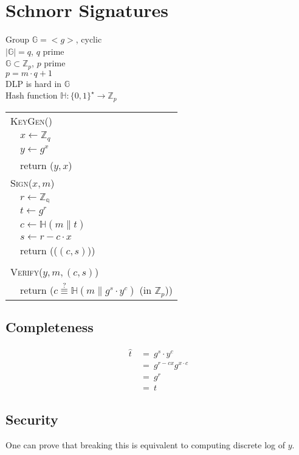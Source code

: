 \documentclass{report}
\begin{document}
\section{Schnorr Signatures}
\begin{adjustwidth}{2em}{2em}
	Group $\mathbb{G} = <g>$, cyclic \\
	$\mid \mathbb{G} \mid = q$, $q$ prime \\
	$\mathbb{G} \subset \mathbb{Z}_p$, $p$ prime \\
	$p = m \cdot q + 1$ \\
	DLP is hard in $\mathbb{G}$ \\
	Hash function $\mathbb{H}: \{ 0,1 \} ^{\star} \rightarrow \mathbb{Z}_p$ \\
	\begin{tabular}{ll}
		\multicolumn{2}{l}{\textsc{KeyGen}()} \\
		& $x \leftarrow \mathbb{Z}_q$ \\
		& $y \leftarrow g^x$ \\
		& return ($y, x$) \\
		\multicolumn{2}{l}{\textsc{Sign}($x, m$)} \\
		& $r \leftarrow \mathbb{Z_q}$ \\
		& $t \leftarrow g^r$ \\
		& $c \leftarrow \mathbb{H}(m \| t)$ \\
		& $s \leftarrow r - c \cdot x$ \\
		& return (($(c, s)$)) \\
		\\
		\multicolumn{2}{l}{\textsc{Verify}($y, m, (c, s)$)} \\
		& return ($c \stackrel{?}{\equiv} \mathbb{H}(m \| g^s \cdot y^c)$ (in $\mathbb{Z}_p$)) \\
	\end{tabular}
	\subsection{Completeness}
	\begin{align*}
		\hat{t} \ & = \ g^s \cdot y^c \\
		& = \ g^{r-cx} g^{x \cdot c} \\
		& = \ g^r \\
		& = \ t 
	\end{align*}
	\subsection{Security}
	\begin{adjustwidth}{2em}{}
		One can prove that breaking this is equivalent to computing discrete log of $y$.
	\end{adjustwidth}
\end{adjustwidth}
\end{document}
